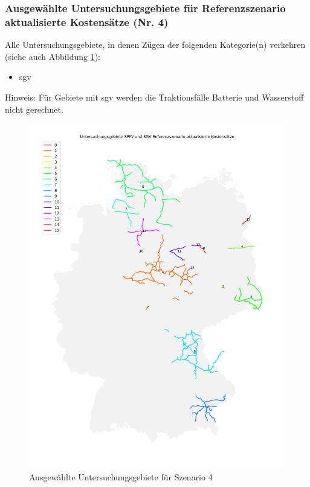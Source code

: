 \subsubsection{Ausgewählte Untersuchungsgebiete für Referenzszenario aktualisierte Kostensätze (Nr. 4)}\label{chap_scenario_4_ausgewählte_untersuchungsgebiete}
Alle Untersuchungsgebiete, in denen Zügen der folgenden Kategorie(n) verkehren (siehe auch Abbildung \ref{fig_s_4_ausgewählte_untersuchungsgebiete}):
\begin{itemize}
    \item \acrlong{sgv}
\end{itemize}

Hinweis: Für Gebiete mit \acrshort{sgv} werden die Traktionsfälle Batterie und Wasserstoff nicht gerechnet.

\begin{center}
	\begin{figure}[p]
	\includegraphics[height=0.85\textheight]{../report_scenarios/s_4/files/master_areas_sgv}
	\caption{\label{fig_s_4_ausgewählte_untersuchungsgebiete} Ausgewählte Untersuchungsgebiete für Szenario 4}
	\end{figure}
\end{center}


